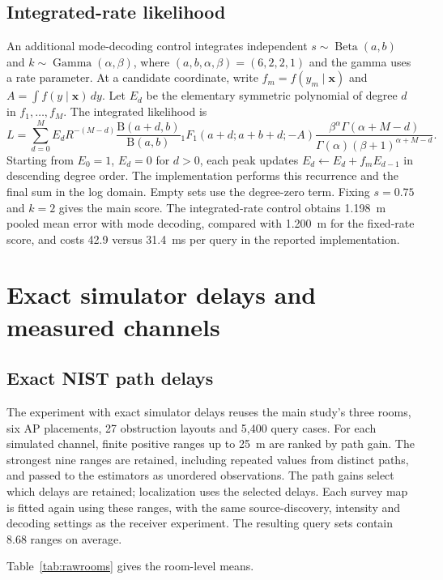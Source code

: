\documentclass[10pt]{article}
\begin{document}
\subsection{Integrated-rate likelihood}
An additional mode-decoding control integrates independent $s\sim\operatorname{Beta}(a,b)$ and $k\sim\operatorname{Gamma}(\alpha,\beta)$, where $(a,b,\alpha,\beta)=(6,2,2,1)$ and the gamma uses a rate parameter. At a candidate coordinate, write $f_m=f(y_m\mid\bm x)$ and $A=\int f(y\mid\bm x)\,dy$. Let $E_d$ be the elementary symmetric polynomial of degree $d$ in $f_1,\ldots,f_M$. The integrated likelihood is
\begin{equation}
L=\sum_{d=0}^{M} E_d R^{-(M-d)}
\frac{\mathrm B(a+d,b)}{\mathrm B(a,b)}
{}_1F_1(a+d;a+b+d;-A)
\frac{\beta^\alpha\Gamma(\alpha+M-d)}{\Gamma(\alpha)(\beta+1)^{\alpha+M-d}}.
\end{equation}
Starting from $E_0=1$, $E_d=0$ for $d>0$, each peak updates $E_d\leftarrow E_d+f_mE_{d-1}$ in descending degree order. The implementation performs this recurrence and the final sum in the log domain. Empty sets use the degree-zero term. Fixing $s=0.75$ and $k=2$ gives the main score. The integrated-rate control obtains 1.198~m pooled mean error with mode decoding, compared with 1.200~m for the fixed-rate score, and costs 42.9 versus 31.4~ms per query in the reported implementation.

\section{Exact simulator delays and measured channels}
\subsection{Exact NIST path delays}
The experiment with exact simulator delays reuses the main study's three rooms, six AP placements, 27 obstruction layouts and 5,400 query cases. For each simulated channel, finite positive ranges up to 25~m are ranked by path gain. The strongest nine ranges are retained, including repeated values from distinct paths, and passed to the estimators as unordered observations. The path gains select which delays are retained; localization uses the selected delays. Each survey map is fitted again using these ranges, with the same source-discovery, intensity and decoding settings as the receiver experiment. The resulting query sets contain 8.68 ranges on average.

Table~\ref{tab:rawrooms} gives the room-level means.

\FloatBarrier
\end{document}
